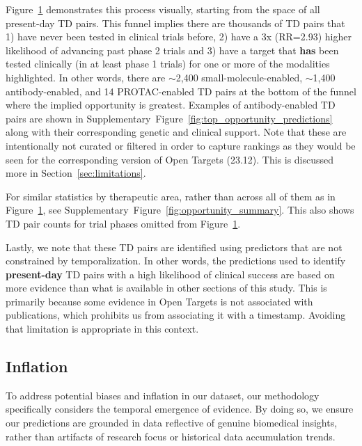 \documentclass{article}
\begin{document}
\begin{figure}[!htb]
{  }
  \label{fig:opportunity_funnel}
\end{figure}

Figure~\ref{fig:opportunity_funnel} demonstrates this process visually, starting from the space of all present-day TD pairs. This funnel implies there are thousands of TD pairs that 1) have never been tested in clinical trials before, 2) have a 3x (RR=2.93) higher likelihood of advancing past phase 2 trials and 3) have a target that \textbf{has} been tested clinically (in at least phase 1 trials) for one or more of the modalities highlighted. In other words, there are $\sim$2,400 small-molecule-enabled, $\sim$1,400 antibody-enabled, and 14 PROTAC-enabled TD pairs at the bottom of the funnel where the implied opportunity is greatest. Examples of antibody-enabled TD pairs are shown in Supplementary~Figure~\ref{fig:top_opportunity_predictions} along with their corresponding genetic and clinical support. Note that these are intentionally not curated or filtered in order to capture rankings as they would be seen for the corresponding version of Open Targets (23.12). This is discussed more in Section~\ref{sec:limitations}.

For similar statistics by therapeutic area, rather than across all of them as in Figure~\ref{fig:opportunity_funnel}, see Supplementary~Figure~\ref{fig:opportunity_summary}. This also shows TD pair counts for trial phases omitted from Figure~\ref{fig:opportunity_funnel}.

Lastly, we note that these TD pairs are identified using predictors that are not constrained by temporalization. In other words, the predictions used to identify \textbf{present-day} TD pairs with a high likelihood of clinical success are based on more evidence than what is available in other sections of this study. This is primarily because some evidence in Open Targets is not associated with publications, which prohibits us from associating it with a timestamp. Avoiding that limitation is appropriate in this context.

\subsection{Inflation}
\label{sec:results_inflation}

To address potential biases and inflation in our dataset, our methodology specifically considers the temporal emergence of evidence. By doing so, we ensure our predictions are grounded in data reflective of genuine biomedical insights, rather than artifacts of research focus or historical data accumulation trends.
\end{document}
